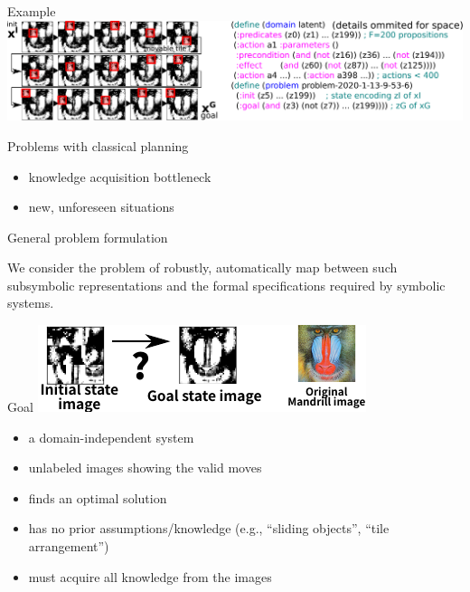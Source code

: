 \documentclass{lecture}
\begin{document}
\begin{frame}{Example}
    \includegraphics[width=\textwidth]{img___15puzzle-with-pddl.pdf}
\end{frame}

\begin{frame}{Problems with classical planning}
    \begin{itemize}
        \item knowledge acquisition bottleneck
        \item new, unforeseen situations
    \end{itemize}            
\end{frame}

\begin{frame}{General problem formulation}
    \begin{block}{}
    We consider the problem of robustly, automatically map between such
subsymbolic representations and the formal specifications required by symbolic systems.
    \end{block}
\end{frame}

\begin{frame}{Goal}
    \includegraphics[width=\textwidth]{img___mandrill-intro-new.pdf}    
    \pause
    \begin{itemize}
        \item  a domain-independent system
        \item  unlabeled images showing the valid moves
        \item finds an optimal solution
        \item  has no prior assumptions/knowledge (e.g., “sliding objects”, “tile arrangement”)
        \item must acquire all knowledge from the images
    \end{itemize}
\end{frame}
\end{document}
